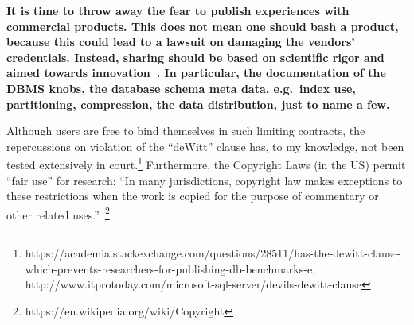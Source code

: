 \documentclass{cidr-2019}
\begin{document}
%
%
{\bf It is time to throw away the fear to publish experiences with
commercial products. This does not mean one should bash a product,
because this could lead to a lawsuit on damaging the vendors'
credentials. Instead, sharing should be based on scientific rigor
and aimed towards innovation~\cite{DBLP:conf/sigmod/RaasveldtHGM18}.
In particular, the documentation of the DBMS knobs, the database
schema meta data, e.g.\ index use, partitioning, compression, the
data distribution, just to name a few.


 Although users are free to bind themselves in such limiting
 contracts, the repercussions on violation of the ``deWitt'' clause
 has, to my knowledge, not been tested extensively in
 court.\footnote{https://academia.stackexchange.com/questions/28511/has-the-dewitt-clause-which-prevents-researchers-for-publishing-db-benchmarks-e,
   http://www.itprotoday.com/microsoft-sql-server/devils-dewitt-clause}
 Furthermore, the Copyright Laws (in the US) permit ``fair use'' for
 research: ``In many jurisdictions, copyright law makes exceptions to
 these restrictions when the work is copied for the purpose of
 commentary or other related
 uses.''~\footnote{https://en.wikipedia.org/wiki/Copyright}}
\end{document}
